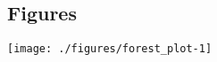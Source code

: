 \documentclass[sn-nature,referee,pdflatex]{sn-jnl}
\begin{document}
\subsection{Figures}\label{figures}

\texttt{[image: ./figures/forest\_plot-1]}

\newpage

\renewcommand\refname{References}

\end{document}
